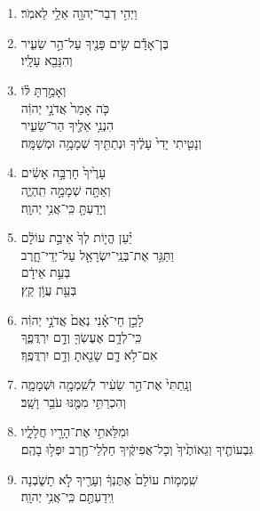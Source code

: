 \documentclass[12pt,a4paper,titlepage]{article}
\def \pscolor{red} %
\def \pslabelsep{0.2em} %
\def \psleftmargin{0em} %
\begin{document}
\begin{hebrew}
      \subsection*{}
      \section*{}
      \vspace{-0.6mm}
      \begin{enumerate}[leftmargin=\psleftmargin, labelsep=\pslabelsep, label=\fontspec{Linux Libertine}\arabic*, font=\color{\pscolor}\small\textsuperscript, parsep=0em, itemsep=0em, topsep=0em]
            \item וַיְהִ֥י דְבַר־יְהוָ֖ה אֵלַ֥י לֵאמֹֽר׃
            \item בֶּן־אָדָ֕ם שִׂ֥ים פָּנֶ֖יךָ עַל־הַ֣ר שֵׂעִ֑יר \\ וְהִנָּבֵ֖א עָלָֽיו׃
            \item וְאָמַ֣רְתָּ לּ֗וֹ\\  כֹּ֤ה אָמַר֙ אֲדֹנָ֣י יְהוִ֔ה \\ הִנְנִ֥י אֵלֶ֖יךָ הַר־שֵׂעִ֑יר \\ וְנָטִ֤יתִי יָדִי֙ עָלֶ֔יךָ וּנְתַתִּ֖יךָ שְׁמָמָ֥ה וּמְשַׁמָּֽה׃
            \item עָרֶ֙יךָ֙ חָרְבָּ֣ה אָשִׂ֔ים \\ וְאַתָּ֖ה שְׁמָמָ֣ה תִֽהְיֶ֑ה \\ וְיָדַעְתָּ֖ כִּֽי־אֲנִ֥י יְהוָֽה׃
            \item יַ֗עַן הֱי֤וֹת לְךָ֙ אֵיבַ֣ת עוֹלָ֔ם \\ וַתַּגֵּ֥ר אֶת־בְּנֵֽי־יִשְׂרָאֵ֖ל עַל־יְדֵי־חָ֑רֶב \\ בְּעֵ֣ת אֵידָ֔ם \\ בְּעֵ֖ת עֲוֹ֥ן קֵֽץ׃
            \item לָכֵ֣ן חַי־אָ֗נִי נְאֻם֙ אֲדֹנָ֣י יְהוִ֔ה \\ כִּֽי־לְדָ֥ם אֶעֶשְׂךָ֖ וְדָ֣ם יִרְדֲּפֶ֑ךָ \\ אִם־לֹ֥א דָ֛ם שָׂנֵ֖אתָ וְדָ֥ם יִרְדֲּפֶֽךָ׃
            \item וְנָֽתַתִּי֙ אֶת־הַ֣ר שֵׂעִ֔יר לְשִֽׁמְמָ֖ה וּשְׁמָמָ֑ה \\ וְהִכְרַתִּ֥י מִמֶּ֖נּוּ עֹבֵ֥ר וָשָֽׁב׃
            \item וּמִלֵּאתִ֥י אֶת־הָרָ֖יו חֲלָלָ֑יו \\ גִּבְעוֹתֶ֤יךָ וְגֵאוֹתֶ֙יךָ֙ וְכָל־אֲפִיקֶ֔יךָ חַלְלֵי־חֶ֖רֶב יִפְּל֥וּ בָהֶֽם׃
            \item שִֽׁמְמ֤וֹת עוֹלָם֙ אֶתֶּנְךָ֔ וְעָרֶ֖יךָ לֹ֣א תָשֹׁ֑בְנָה \\ וִֽידַעְתֶּ֖ם כִּֽי־אֲנִ֥י יְהוָֽה׃

\end{enumerate}
\end{hebrew}
\end{document}
